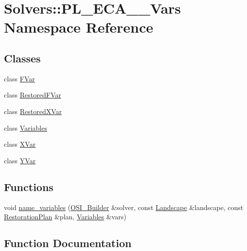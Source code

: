 \hypertarget{namespace_solvers_1_1_p_l___e_c_a__2___vars}{}\section{Solvers\+:\+:P\+L\+\_\+\+E\+C\+A\+\_\+\_\+\+Vars Namespace Reference}
\label{namespace_solvers_1_1_p_l___e_c_a__2___vars}
\subsection*{Classes}
\begin{DoxyCompactItemize}
\item 
class \hyperlink{class_solvers_1_1_p_l___e_c_a__2___vars_1_1_f_var}{F\+Var}
\item 
class \hyperlink{class_solvers_1_1_p_l___e_c_a__2___vars_1_1_restored_f_var}{Restored\+F\+Var}
\item 
class \hyperlink{class_solvers_1_1_p_l___e_c_a__2___vars_1_1_restored_x_var}{Restored\+X\+Var}
\item 
class \hyperlink{class_solvers_1_1_p_l___e_c_a__2___vars_1_1_variables}{Variables}
\item 
class \hyperlink{class_solvers_1_1_p_l___e_c_a__2___vars_1_1_x_var}{X\+Var}
\item 
class \hyperlink{class_solvers_1_1_p_l___e_c_a__2___vars_1_1_y_var}{Y\+Var}
\end{DoxyCompactItemize}
\subsection*{Functions}
\begin{DoxyCompactItemize}
\item 
void \hyperlink{namespace_solvers_1_1_p_l___e_c_a__2___vars_abff464b2e6b972cc535acc5883b9aef1}{name\+\_\+variables} (\hyperlink{class_o_s_i___builder}{O\+S\+I\+\_\+\+Builder} \&solver, const \hyperlink{class_landscape}{Landscape} \&landscape, const \hyperlink{class_restoration_plan}{Restoration\+Plan} \&plan, \hyperlink{class_solvers_1_1_p_l___e_c_a__2___vars_1_1_variables}{Variables} \&vars)
\end{DoxyCompactItemize}


\subsection{Function Documentation}
\mbox{\label{namespace_solvers_1_1_p_l___e_c_a__2___vars_abff464b2e6b972cc535acc5883b9aef1}} 
